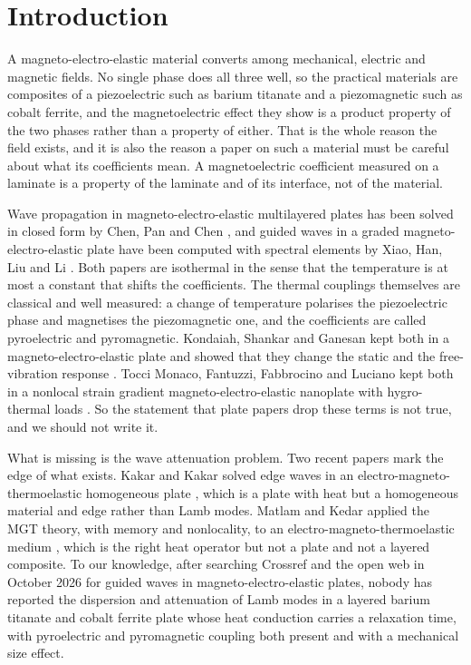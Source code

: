 \documentclass[11pt]{article}
\begin{document}
\section{Introduction}

A magneto-electro-elastic material converts among mechanical, electric and magnetic fields. No single phase
does all three well, so the practical materials are composites of a piezoelectric such as barium titanate and
a piezomagnetic such as cobalt ferrite, and the magnetoelectric effect they show is a product property of the
two phases rather than a property of either. That is the whole reason the field exists, and it is also the
reason a paper on such a material must be careful about what its coefficients mean. A magnetoelectric
coefficient measured on a laminate is a property of the laminate and of its interface, not of the material.

Wave propagation in magneto-electro-elastic multilayered plates has been solved in closed form by Chen, Pan
and Chen \cite{Chen2007}, and guided waves in a graded magneto-electro-elastic plate have been computed with
spectral elements by Xiao, Han, Liu and Li \cite{Xiao2016}. Both papers are isothermal in the sense that the
temperature is at most a constant that shifts the coefficients. The thermal couplings themselves are
classical and well measured: a change of temperature polarises the piezoelectric phase and magnetises the
piezomagnetic one, and the coefficients are called pyroelectric and pyromagnetic. Kondaiah, Shankar and
Ganesan kept both in a magneto-electro-elastic plate and showed that they change the static and the
free-vibration response \cite{Kondaiah2013}. Tocci Monaco, Fantuzzi, Fabbrocino and Luciano kept both in a
nonlocal strain gradient magneto-electro-elastic nanoplate with hygro-thermal loads \cite{Tocci2021}. So the
statement that plate papers drop these terms is not true, and we should not write it.

What is missing is the wave attenuation problem. Two recent papers mark the edge of what exists. Kakar and
Kakar solved edge waves in an electro-magneto-thermoelastic homogeneous plate \cite{Kakar2015}, which is a
plate with heat but a homogeneous material and edge rather than Lamb modes. Matlam and Kedar applied the MGT
theory, with memory and nonlocality, to an electro-magneto-thermoelastic medium
\cite{Matlam2026}, which is the right heat operator but not a plate and not a layered composite. To our
knowledge, after searching Crossref and the open web in October 2026 for guided waves in magneto-electro-elastic
plates, nobody has reported the dispersion and attenuation of Lamb modes in a layered
barium titanate and cobalt ferrite plate whose heat conduction carries a relaxation time, with pyroelectric
and pyromagnetic coupling both present and with a mechanical size effect.
\end{document}
